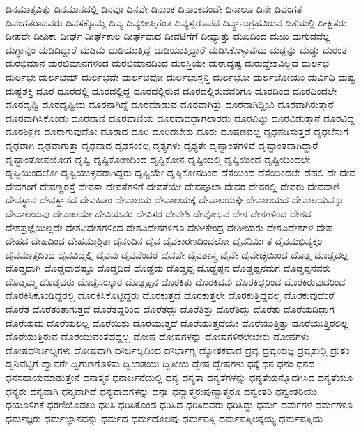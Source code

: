 {ದಿನಮಾತ್ರವಿತ್ತು
ದಿನಮಾನದಲ್ಲಿ
ದಿನವೂ
ದಿನವೇ
ದಿನಾಂಕ
ದಿನಾಂಕದಂದೇ
ದಿನಾಲೂ
ದಿನೇ
ದಿವಂಗತ
ದಿವಂಗತರಾದವರು
ದಿವಸಕ್ಕೊಮ್ಮೆ
ದಿವ್ಯ
ದಿವ್ಯದೀಪ್ತಿಗೆಂತ
ದಿವ್ಯಸ್ವರೂಪದ
ದಿವ್ಯಾನುಗ್ರಹವಿರುವ
ದಿಶೆಯಲ್ಲಿ
ದೀಕ್ಷಿತರು
ದೀಪವೇ
ದೀಪಿಕಾ
ದೀರ್ಘ
ದೀರ್ಘಕಾಲ
ದೀರ್ಘವಾದ
ದೀವಟಿಗೆಗೆ
ದೀವ್ಯಾತ್ತು
ದುಖದಿಂದ
ದುಃಖ
ದುಗುಡವೆಲ್ಲ
ದುಗ್ಧಾನ್ನಂ
ದುಡಿದಿದ್ದಾರೆ
ದುಡಿಮೆ
ದುಡಿಯುತ್ತಿದ್ದ
ದುಡಿಯುತ್ತಿದ್ದಾರೆ
ದುಡಿಸಿಕೊಳ್ಳುವುದು
ದುಡ್ಡನ್ನು
ದುಡ್ಡು
ದುರಂತ
ದುರಭಿಮಾನ
ದುರಭಿಮಾನಗಳಿಂದ
ದುರಭಿಮಾನದಿಂದ
ದುರಸ್ತಿಯೇ
ದುರಾದೃಷ್ಟ
ದುರುದ್ದೇಶವಿಲ್ಲದೆ
ದುರ್ಲಭ
ದುರ್ಲಭಃ
ದುರ್ಲಭಮ್
ದುರ್ಲಭವೇ
ದುರ್ಲಭವೋ
ದುರ್ಲಭಾಸ್ಸನ್ತಿ
ದುರ್ಲಭೋ
ದುರ್ಲಭೋಯಂ
ದುರ್ವಿಧಿ
ದುಷ್ಟ
ದುಷ್ಟಶಕ್ತಿ
ದೂರ
ದೂರದಲ್ಲಿ
ದೂರದಲ್ಲಿದ್ದ
ದೂರದಲ್ಲಿರುವ
ದೂರದಲ್ಲಿರುವವರಿಗೂ
ದೂರದಿಂದ
ದೂರದಿಂದಲೇ
ದೂರದೃಷ್ಟಿ
ದೂರದೃಷ್ಟಿಯ
ದೂರನಾಗಿದ್ದೆ
ದೂರಮಾಡುವ
ದೂರವಾಗಿತ್ತು
ದೂರವಾಗಿದ್ದೀವಿ
ದೂರವಾಗಿರುತ್ತಾರೆ
ದೂರವಾಗಿಸಿಕೊಂಡು
ದೂರವಾಣಿ
ದೂರವಾಣಿಯ
ದೂರವಾದದ್ದಾಗಲಾರದು
ದೂರವಿಟ್ಟು
ದೂರವಿಡುತ್ತಾನೆ
ದೂರವಿದ್ದ
ದೂರಶಿಕ್ಷಣ
ದೂರಾಗುವುದೋ
ದೂರಾದ
ದೂರಿ
ದೂರಿಡಬೇಕು
ದೂರು
ದೂಷಣವಲ್ಲ
ದೃಢಪಡಿಸುತ್ತದೆ
ದೃಢಬೆಸುಗೆ
ದೃಢವಾಗಿ
ದೃಢವಾಗುತ್ತಾ
ದೃಢವಾದ
ದೃಢಸಂಕಲ್ಪ
ದೃಶ್ಯಗಳು
ದೃಶ್ಯತೇ
ದೃಷ್ಟಾಂತಗಳಿವೆ
ದೃಷ್ಟಾಂತವಾಗಿದ್ದಾರೆ
ದೃಷ್ಟಾಂತೋಪಯೋಗ
ದೃಷ್ಟಿ
ದೃಷ್ಟಿಕೋಣದಿಂದ
ದೃಷ್ಟಿಕೋನ
ದೃಷ್ಟಿಯಲ್ಲಿ
ದೃಷ್ಟಿಯಿಂದ
ದೃಷ್ಟಿಯಿಂದಲೇ
ದೃಷ್ಟಿಯಿಂದಲೋ
ದೃಷ್ಟಿಯುಳ್ಳವರಾಗಿದ್ದರು
ದೃಷ್ಟಿಯೇ
ದೃಷ್ಠಿಕೋನದಿಂದ
ದೆಸೆಯಿಂದ
ದೆಸೆಯಿಂದಲೇ
ದೆಹಲಿ
ದೇ
ದೇವ
ದೇವಗಂಗೆ
ದೇವಣ್ಣರಸ್ತೆ
ದೇವತಾ
ದೇವತೆಗಳಿಗೆ
ದೇವತೆಯೇ
ದೇವಪೂಜಾ
ದೇವರ
ದೇವರಲ್ಲಿ
ದೇವರು
ದೇವವಾಣಿ
ದೇವಸ್ಥಾನ
ದೇವಸ್ಥಾನದ
ದೇವಹಿತಂ
ದೇವಾಲಯ
ದೇವಾಲಯಕ್ಕೆ
ದೇವಾಲಯಕ್ಕೇ
ದೇವಾಲಯದ
ದೇವಾಲಯವನ್ನು
ದೇವಾಲಯವು
ದೇವಾಲಯೇ
ದೇವಿಯವರ
ದೇವಿಸರ
ದೇವೇಶಿ
ದೇವೋಭವ
ದೇಶ
ದೇಶಗಳಿಂದ
ದೇಶದ
ದೇಶಪ್ರಜ್ಞೆಯಿಲ್ಲದೇ
ದೇಶವಿದೇಶಗಳಿಂದ
ದೇಶವಿದೇಶಗಳಿಗೂ
ದೇಶೀಕೇಂದ್ರ
ದೇಶೀಯರು
ದೇಶವಿದೇಶಗಳ
ದೇಹ
ದೇಹದ
ದೇಹದಿಂದ
ದೇಹಮಾಶ್ರಿತಃ
ದೈನಂದಿನ
ದೈವ
ದೈವಕಾರಣದಿಂದಲೋ
ದೈವನಿರ್ಮಿತ
ದೈವಮಭಿವ್ಯಕ್ತಂ
ದೈವಮಾತ್ರದಿಂದ
ದೈವವಿದ್ದಲ್ಲಿ
ದೈವವು
ದೈವವೆಂದರೆ
ದೈವವೇ
ದೈವಶಾಸ್ತ್ರ
ದೈವೇ
ದೈವೇಚ್ಛೆಯಿಂದ
ದೊಡ್ಡ
ದೊಡ್ಡದಲ್ಲ
ದೊಡ್ಡದಾಗಿ
ದೊಡ್ಡದಾದಷ್ಟೂ
ದೊಡ್ಡದಿದೆ
ದೊಡ್ಡದು
ದೊಡ್ಡಪ್ಪ
ದೊಡ್ಡಪ್ಪನ
ದೊಡ್ಡಪ್ಪನಮಗ
ದೊಡ್ಡಪ್ಪನವರು
ದೊಡ್ಡಮ್ಮ
ದೊಡ್ಡವರು
ದೊಡ್ಡಸಂಸ್ಕಾರ
ದೊಡ್ದಪ್ಪನ
ದೊರಕಿತು
ದೊರಕಿದವು
ದೊರಕಿದ್ದರಿಂದ
ದೊರಕಿರುವುದರಿಂದ
ದೊರಕಿಸಿಕೊಂಡಿದ್ದರಲ್ಲಿ
ದೊರಕಿಸಿಕೊಟ್ಟಿದ್ದರು
ದೊರಕುತ್ತದೆ
ದೊರಕುತ್ತಲೇ
ದೊರಕುತ್ತಿದ್ದವಲ್ಲ
ದೊರಕುವುದೆಂರೆ
ದೊರೆತ
ದೊರೆತಂತಾಗುತ್ತದೆ
ದೊರೆತದ್ದರಿಂದ
ದೊರೆತದ್ದು
ದೊರೆತಿತ್ತು
ದೊರೆತಿದ್ದು
ದೊರೆತು
ದೊರೆಯದಿದ್ದಾಗ
ದೊರೆಯದು
ದೊರೆಯಲಿಲ್ಲ
ದೊರೆಯಿತು
ದೊರೆಯುತ್ತದೆ
ದೊರೆಯುತ್ತದೆಯೇ
ದೊರೆಯುತ್ತಿತ್ತು
ದೊರೆಯುತ್ತಿರಲಿಲ್ಲ
ದೊರೆಯುತ್ತಿರುವ
ದೊರೆಯುವಂತಹದ್ದಲ್ಲ
ದೋಷ
ದೋಷಗಳನ್ನು
ದೋಷಗಳಿರಲೇಬೇಕು
ದೋಷಗಳು
ದೋಷದೌರ್ಬಲ್ಯಗಳು
ದೋಷವಾಗಿ
ದೌರ್ಬಲ್ಯದಿಂದ
ದೌರ್ಭಾಗ್ಯ
ದ್ಯೋತಕವಾದ
ದ್ರವ್ಯ
ದ್ರವ್ಯಯಜ್ಞ
ದ್ರವ್ಯಶುದ್ಧಿ
ದ್ರುತಂ
ದ್ವನಿಪೆಟ್ಟಿಗೆ
ದ್ವಾಪರೇ
ದ್ವಿಗುಣಗೊಳಿಸು
ದ್ವಿಜಾತಯಃ
ದ್ವಿತೀಯ
ದ್ವೇಷ
ದ್ವೇಷಗಳು
ಧಕ್ಕೆ
ಧನ
ಧನಂ
ಧನದ
ಧನಸಹಾಯಮಾಡುತ್ತೇನೆ
ಧನಾತ್ಮಕ
ಧನಾರ್ಜನೆಯಲ್ಲಿ
ಧನ್ಯ
ಧನ್ಯತಾ
ಧನ್ಯತೆಗಳನ್ನು
ಧನ್ಯತೆಯನ್ನೊದಗಿಸಿದ
ಧನ್ಯತೆಯೂ
ಧನ್ಯರು
ಧನ್ಯವಾಗಿ
ಧನ್ಯವಾಗಿದೆ
ಧನ್ಯವಾದಗಳನ್ನು
ಧನ್ಯಾ
ಧನ್ಯಾತ್ಮರುಪುಣ್ಯಾತ್ಮರೂ
ಧನ್ವಂತರಿ
ಧನ್ವಂತರಿಯು
ಧಯೂಳಿಗಕೆ
ಧರಣಿಯೊಡಲು
ಧರಿಸಿ
ಧರಿಸಿಕೊಂಡ
ಧರಿಸಿದ
ಧರಿಸಿದವರು
ಧರಿಸಿದ್ದು
ಧರ್ಮ
ಧರ್ಮಗಳ
ಧರ್ಮಗಳೂ
ಧರ್ಮಜ್ಞರು
ಧರ್ಮಜ್ಞಾನವನ್ನು
ಧರ್ಮದ
ಧರ್ಮದೊಲವು
ಧರ್ಮಪತ್ನಿ
ಧರ್ಮಪತ್ನಿಅಕ್ಕಯ್ಯ
ಧರ್ಮಪತ್ನಿಯ
}
